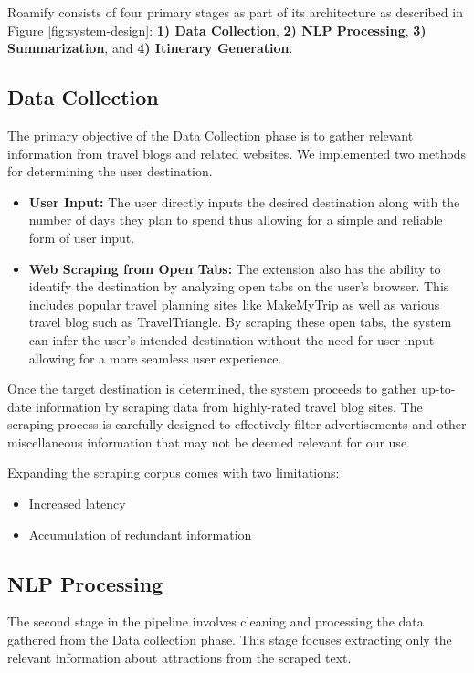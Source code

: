 \documentclass[sigconf,authordraft]{acmart}
\begin{document}
  Roamify consists of four primary stages as part of its architecture as described in Figure \ref{fig:system-design}: \textbf{1) Data Collection}, \textbf{2) NLP Processing}, \textbf{3) Summarization}, and \textbf{4) Itinerary Generation}.

\subsection{Data Collection}
    The primary objective of the Data Collection phase is to gather relevant information from travel blogs and related websites. We implemented two methods for determining the user destination.

    \begin{itemize}
        \item \textbf{User Input:} The user directly inputs the desired destination along with the number of days they plan to spend thus allowing for a simple and reliable form of user input.

        \item \textbf{Web Scraping from Open Tabs:} The extension also has
        the ability to identify the destination by analyzing open tabs on the user's browser. This includes popular travel planning sites like MakeMyTrip as well as various travel blog such as TravelTriangle. By scraping these open tabs, the system can infer the user’s intended destination without the need for user input allowing for a more seamless user experience.
    \end{itemize}

    Once the target destination is determined, the system proceeds to gather up-to-date information by scraping data from highly-rated travel blog sites. The scraping process is carefully designed to effectively filter advertisements and other miscellaneous information that may not be deemed relevant for our use.

    Expanding the scraping corpus comes with two limitations:
    \begin{itemize}
        \item Increased latency
        \item Accumulation of redundant information
    \end{itemize}

  \subsection{NLP Processing}
    The second stage in the pipeline involves cleaning and processing the data gathered from the Data collection phase. This stage focuses extracting only the relevant information about attractions from the scraped text.
\end{document}
